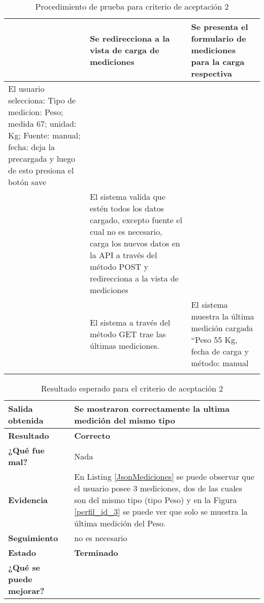 \begin{longtable}{|m{4cm}|m{5cm}|m{4cm}|}
        & Se redirecciona a la vista de carga de mediciones&Se presenta el formulario de mediciones para la carga respectiva\\ \hline
        El usuario selecciona: Tipo de medicion: Peso; medida 67; unidad: Kg; Fuente: manual; fecha: deja la precargada y  luego de esto presiona el botón save& &\\ \hline       
        & El sistema valida que estén todos los datos cargado, excepto fuente el cual no es necesario, carga los nuevos datos en la API a través del método POST y redirecciona a la vista de mediciones&\\ \hline       
        &El sistema a través del método GET trae las últimas mediciones. &El sistema muestra la última medición cargada ``Peso 55 Kg, fecha de carga y método: manual\\ \hline
        \caption{Procedimiento de prueba para criterio de aceptación 2}
        
	    \end{longtable}
        
\clearpage

{\scriptsize
	\begin{table}[h]
	\centering
	\begin{tabular}{|m{3cm}|m{10cm}|}
	    \hline 
	    \textbf{Salida obtenida}& Se mostraron correctamente la ultima medición del mismo tipo\\ \hline
	    \textbf{Resultado}& \textbf{Correcto}\\ \hline
        \textbf{¿Qué fue mal?}& Nada\\ \hline      
        \textbf{Evidencia}& En Listing \ref{JsonMediciones} se puede observar que el usuario posee 3 mediciones, dos de las cuales son del mismo tipo (tipo Peso) y en la Figura \ref{perfil_id_3} se puede ver que solo se muestra la última medición del Peso.  \\ \hline
        \textbf{Seguimiento}& no es necesario\\ \hline
        \textbf{Estado}& \textbf{Terminado}\\ \hline        
        \textbf{¿Qué se puede mejorar?}& \\ \hline              
	    \end{tabular}
        \caption{Resultado esperado para el criterio de aceptación 2}
    	\end{table}
	}


